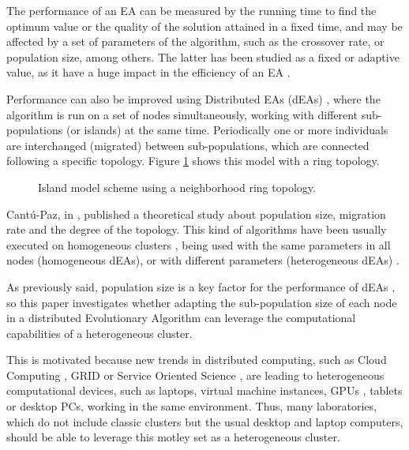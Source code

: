 \documentclass[final,1p,times]{elsarticle}
\begin{document}
The performance of an EA can be measured by the running time to find the optimum value 
or the quality of the solution attained in a fixed time, and may be affected by a set 
of parameters of the algorithm, such as the crossover rate, or population size, among others. 
The latter has been studied as a fixed \cite{SizingHarik99} or adaptive 
\cite{SelfRegulatedSizeFernandes06,AdaptiveLobo07} value, as it have a huge impact in the efficiency of an EA \cite{ShrinkageLaredo09}.

Performance can also be improved using Distributed EAs (dEAs) \cite{MULTIKULTI}, where the algorithm is run on a set of nodes simultaneously,
working with different sub-populations (or islands) at the same
time. Periodically one or more individuals are
interchanged (migrated) between sub-populations, which are connected
following a specific topology. Figure \ref{fig:islands} shows this
model with a ring topology. 


\begin{figure}[htb]
\centering
{}
\caption{Island model scheme using a neighborhood ring topology.}
\label{fig:islands}
\end{figure}






Cant{\'u}-Paz, in \cite{CantuPazTopologies99}, published a theoretical study about population size, migration rate and the degree of the topology.  This kind of algorithms have been usually executed on homogeneous clusters \cite{MULTIKULTI,Wakunda97EVA}, being used with the same
parameters in all nodes (homogeneous dEAs), or with different
parameters (heterogeneous dEAs) \cite{garcia2014randomized,tanabe2013evaluation,HETEROGENEOUSPARAMETERS}. 



As previously said, population size is a key factor for the performance 
of dEAs \cite{ShrinkageLaredo09}, so this paper investigates whether
adapting the sub-population size of each node in a distributed
Evolutionary Algorithm can leverage the
computational capabilities of a heterogeneous cluster.                             

This is motivated because new trends in distributed computing, such as Cloud Computing \cite{Derby13Cloud}, GRID
\cite{OPENSCIENCEGRID} or Service Oriented Science \cite{GLOBUS}, are
leading to heterogeneous computational devices, such as laptops,
virtual machine instances, 
GPUs \cite{Acosta13GPUs},
tablets or desktop PCs, working in the same
environment. Thus, many laboratories, which do not include classic
clusters but the usual desktop and laptop computers, should be able to leverage
this motley set as a heterogeneous cluster. 
\end{document}
